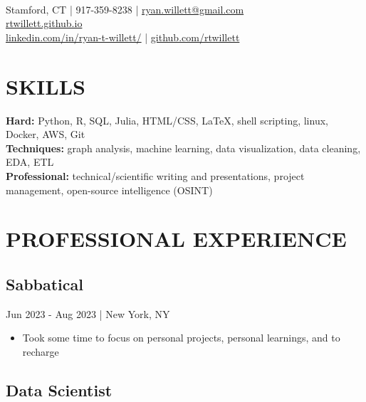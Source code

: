 \documentclass[11pt]{article}
\title{\vspace{-6cm}}
\date{}
\author{Ryan Willett}
\newenvironment{myitemize}
{ \begin{itemize}
	\setlength{\itemsep}{0pt}
	\setlength{\parskip}{0pt}
	\setlength{\parsep}{0pt}     }
{ \end{itemize}                  }
\begin{document}
\maketitle

\section*{}
  \\
\normalsize
Stamford, CT | 917-359-8238 | \href{mailto:ryan.willett@gmail.com}{ryan.willett@gmail.com} \\
\href{http://rtwillett.github.io}{rtwillett.github.io} \\
\href{https://linkedin.com/in/ryan-t-willett/}{linkedin.com/in/ryan-t-willett/} | \href{https://github.com/rtwillett}{github.com/rtwillett}

\raggedright

\section*{SKILLS}
\vspace{-3truemm}

{\bfseries Hard:} Python, R, SQL, Julia, HTML/CSS, \LaTeX, shell scripting, linux, Docker, AWS, Git \\
{\bfseries Techniques:} graph analysis, machine learning, data visualization, data cleaning, EDA, ETL \\
{\bfseries Professional:} technical/scientific writing and presentations, project management, open-source intelligence (OSINT)

\section*{PROFESSIONAL EXPERIENCE}

\subsection*{Sabbatical}
\vspace{-2truemm} 
{\bfseries}Jun 2023 - Aug 2023 | New York, NY
\begin{myitemize}
	\item Took some time to focus on personal projects, personal learnings, and to recharge
\end{myitemize}

\subsection*{Data Scientist}
\vspace{-2truemm}
\end{document}
